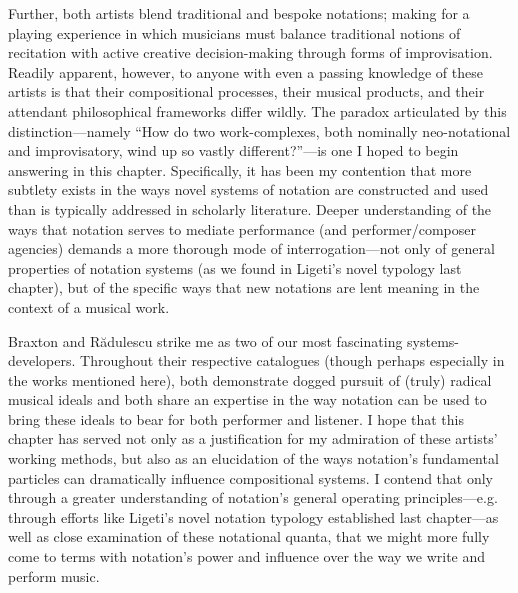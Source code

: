     Further, both artists blend traditional and bespoke notations; making for a playing experience in which musicians must balance traditional notions of recitation with active creative decision-making through forms of improvisation. Readily apparent, however, to anyone with even a passing knowledge of these artists is that their compositional processes, their musical products, and their attendant philosophical frameworks differ wildly. The paradox articulated by this distinction---namely ``How do two work-complexes, both nominally neo-notational and improvisatory, wind up so vastly different?''---is one I hoped to begin answering in this chapter. Specifically, it has been my contention that more subtlety exists in the ways novel systems of notation are constructed and used than is typically addressed in scholarly literature. Deeper understanding of the ways that notation serves to mediate performance (and performer/composer agencies) demands a more thorough mode of interrogation---not only of general properties of notation systems (as we found in Ligeti's novel typology last chapter), but of the specific ways that new notations are lent meaning in the context of a musical work. 

    Braxton and R\u{a}dulescu strike me as two of our most fascinating systems-developers. Throughout their respective catalogues (though perhaps especially in the works mentioned here), both demonstrate dogged pursuit of (truly) radical musical ideals and both share an expertise in the way notation can be used to bring these ideals to bear for both performer and listener. I hope that this chapter has served not only as a justification for my admiration of these artists' working methods, but also as an elucidation of the ways notation's fundamental particles can dramatically influence compositional systems. I contend that only through a greater understanding of notation's general operating principles---e.g. through efforts like Ligeti's novel notation typology established last chapter---as well as close examination of these notational quanta, that we might more fully come to terms with notation's power and influence over the way we write and perform music.


